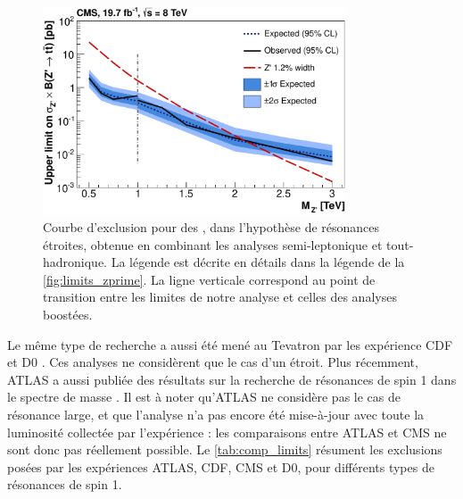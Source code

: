 \begin{figure}[p]
  \centering
  \includegraphics[width=0.80\textwidth]{chapitre7/figs/limits_narrow_full_comb.pdf}
  \caption{Courbe d'exclusion pour des \zprime, dans l'hypothèse de résonances étroites, obtenue en combinant les analyses semi-leptonique et tout-hadronique. La légende est décrite en détails dans la légende de la \cref{fig:limits_zprime}. La ligne verticale correspond au point de transition entre les limites de notre analyse et celles des analyses boostées.}
  \label{fig:limits_narrow_cms_full}
\end{figure}

\bigskip

Le même type de recherche a aussi été mené au Tevatron par les expérience CDF et D0 \citep{Aaltonen:2012af,Abazov:2011gv}. Ces analyses ne considèrent que le cas d'un \zprime étroit. Plus récemment, ATLAS a aussi publiée des résultats sur la recherche de résonances de spin 1 dans le spectre de masse \ttbar \citep{ATLAS-CONF-2013-052}. Il est à noter qu'ATLAS ne considère pas le cas de résonance large, et que l'analyse n'a pas encore été mise-à-jour avec toute la luminosité collectée par l'expérience : les comparaisons entre ATLAS et CMS ne sont donc pas réellement possible. Le \cref{tab:comp_limits} résument les exclusions posées par les expériences ATLAS, CDF, CMS et D0, pour différents types de résonances de spin 1.

